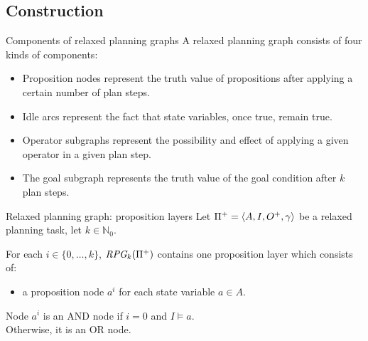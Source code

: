 \documentclass{gkibeamer}
\begin{document}
\subsection{Construction}

\begin{frame}{Components of relaxed planning graphs}
  A relaxed planning graph consists of four kinds of components:
  \begin{itemize}
  \item \alert{Proposition nodes} represent the truth value of
    propositions after applying a certain number of plan steps.
  \item \alert{Idle arcs} represent the fact that state variables,
    once true, remain true.
  \item \alert{Operator subgraphs} represent the possibility and effect
    of applying a given operator in a given plan step.
  \item The \alert{goal subgraph} represents the truth value of the
    goal condition after $k$ plan steps.
  \end{itemize}
\end{frame}

\begin{frame}{Relaxed planning graph: proposition layers}
  Let ${\Pi}^+ = \langle A, I, {O}^+, \gamma\rangle$
  be a relaxed planning task, let $k \in \mathbb N_0$.

  \bigskip

  For each $i \in \{0, \dots, k\}$, $\textit{RPG}_k({\Pi}^+)$
  contains one \alert{proposition layer} which consists of:
  \begin{itemize}
  \item a \alert{proposition node $a^{i}$} for each state variable $a
    \in A$.
  \end{itemize}

  Node $a^i$ is an AND node if $i = 0$ and $I \models a$. \\
  Otherwise, it is an OR node.
\end{frame}
\end{document}
